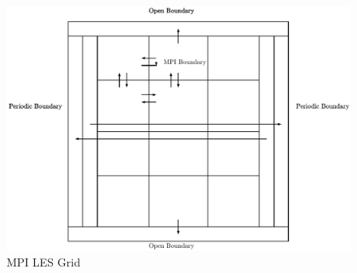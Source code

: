 \documentclass{article}
\begin{document}
\begin{figure}
    \includegraphics[width=\linewidth]{Diagrams/mpiLESGrid.pdf}
    \caption{MPI LES Grid}
    \label{fig:mpiLESGrid}
\end{figure}
\end{document}
